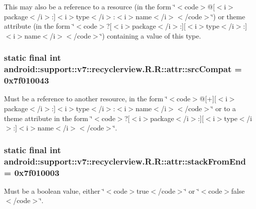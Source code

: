 This may also be a reference to a resource (in the form \char`\"{}$<$code$>$@\mbox{[}$<$i$>$package$<$/i$>$:\mbox{]}$<$i$>$type$<$/i$>$:$<$i$>$name$<$/i$>$$<$/code$>$\char`\"{}) or theme attribute (in the form \char`\"{}$<$code$>$?\mbox{[}$<$i$>$package$<$/i$>$:\mbox{]}\mbox{[}$<$i$>$type$<$/i$>$:\mbox{]}$<$i$>$name$<$/i$>$$<$/code$>$\char`\"{}) containing a value of this type. \hypertarget{classandroid_1_1support_1_1v7_1_1recyclerview_1_1_r_1_1attr_6427e2489471de94d0ec1e7593f32b8b}{
\subsubsection[{srcCompat}]{\setlength{\rightskip}{0pt plus 5cm}static final int android::support::v7::recyclerview.R.R::attr::srcCompat = 0x7f010043}}
\label{classandroid_1_1support_1_1v7_1_1recyclerview_1_1_r_1_1attr_6427e2489471de94d0ec1e7593f32b8b}


Must be a reference to another resource, in the form \char`\"{}$<$code$>$@\mbox{[}+\mbox{]}\mbox{[}$<$i$>$package$<$/i$>$:\mbox{]}$<$i$>$type$<$/i$>$:$<$i$>$name$<$/i$>$$<$/code$>$\char`\"{} or to a theme attribute in the form \char`\"{}$<$code$>$?\mbox{[}$<$i$>$package$<$/i$>$:\mbox{]}\mbox{[}$<$i$>$type$<$/i$>$:\mbox{]}$<$i$>$name$<$/i$>$$<$/code$>$\char`\"{}. \hypertarget{classandroid_1_1support_1_1v7_1_1recyclerview_1_1_r_1_1attr_43dfa7905b265e45d3e6f684d8c85c98}{
\subsubsection[{stackFromEnd}]{\setlength{\rightskip}{0pt plus 5cm}static final int android::support::v7::recyclerview.R.R::attr::stackFromEnd = 0x7f010003}}
\label{classandroid_1_1support_1_1v7_1_1recyclerview_1_1_r_1_1attr_43dfa7905b265e45d3e6f684d8c85c98}


Must be a boolean value, either \char`\"{}$<$code$>$true$<$/code$>$\char`\"{} or \char`\"{}$<$code$>$false$<$/code$>$\char`\"{}. 

